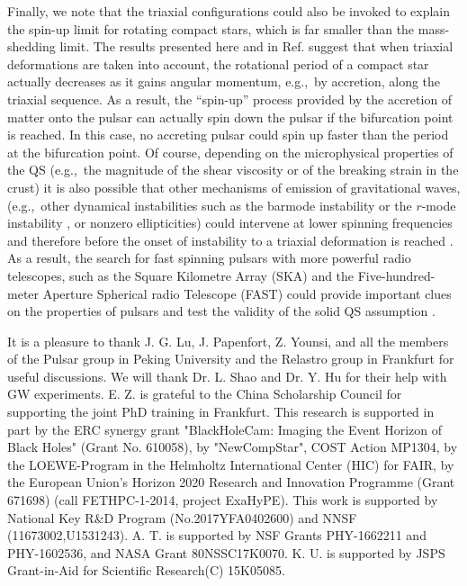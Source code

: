 \documentclass[twocolumn,superscriptaddress,showpacs,prd,aps,amsmath,amssymb,nofootinbib]{revtex4-1}
\newcommand{\eg}{e.g.,~}
\begin{document}
Finally, we note that the triaxial configurations could also be invoked
to explain the spin-up limit for rotating compact stars, which is far
smaller than the mass-shedding limit.  The results presented here and in
Ref.  \cite{Huang08} suggest that when triaxial deformations are taken
into account, the rotational period of a compact star actually decreases
as it gains angular momentum, \eg by accretion, along the triaxial
sequence. As a result, the ``spin-up'' process provided by the accretion
of matter onto the pulsar can actually spin down the pulsar if the
bifurcation point is reached. In this case, no accreting pulsar could
spin up faster than the period at the bifurcation point. Of
  course, depending on the microphysical properties of the QS (\eg the
  magnitude of the shear viscosity or of the breaking strain in the
  crust) it is also possible that other mechanisms of emission of
  gravitational waves, (\eg other dynamical instabilities such as the
  barmode instability \cite{Watts:2003nn, Corvino:2010} or the $r$-mode
  instability \cite{Andersson1998, Friedman1998, Andersson99}, or nonzero
  ellipticities) could intervene at lower spinning frequencies and
  therefore before the onset of instability to a triaxial deformation is
  reached \cite{Bildsten98, Andersson:2009yt}. As a result, the search
  for fast spinning pulsars with more powerful radio telescopes, such as
  the Square Kilometre Array (SKA) and the Five-hundred-meter Aperture
  Spherical radio Telescope (FAST) \cite{SKAdoc, Nan2011} could provide
  important clues on the properties of pulsars and test the validity of
  the solid QS assumption \cite{Xu2003}.


\acknowledgments It is a pleasure to thank J. G. Lu, J. Papenfort,
Z. Younsi, and all the members of the Pulsar group in Peking University
and the Relastro group in Frankfurt for useful discussions.  We will
thank Dr. L. Shao and Dr. Y. Hu for their help with GW
experiments. E. Z. is grateful to the China Scholarship Council for
supporting the joint PhD training in Frankfurt. This research is
supported in part by the ERC synergy grant "BlackHoleCam: Imaging the
Event Horizon of Black Holes" (Grant No. 610058), by "NewCompStar", COST
Action MP1304, by the LOEWE-Program in the Helmholtz International Center
(HIC) for FAIR, by the European Union's Horizon 2020 Research and
Innovation Programme (Grant 671698) (call FETHPC-1-2014, project
ExaHyPE). This work is supported by National Key R\&D Program
(No.2017YFA0402600) and NNSF (11673002,U1531243). A. T. is supported by
NSF Grants PHY-1662211 and PHY-1602536, and NASA Grant 80NSSC17K0070.
K. U. is supported by JSPS Grant-in-Aid for Scientific Research(C)
15K05085.




\end{document}
